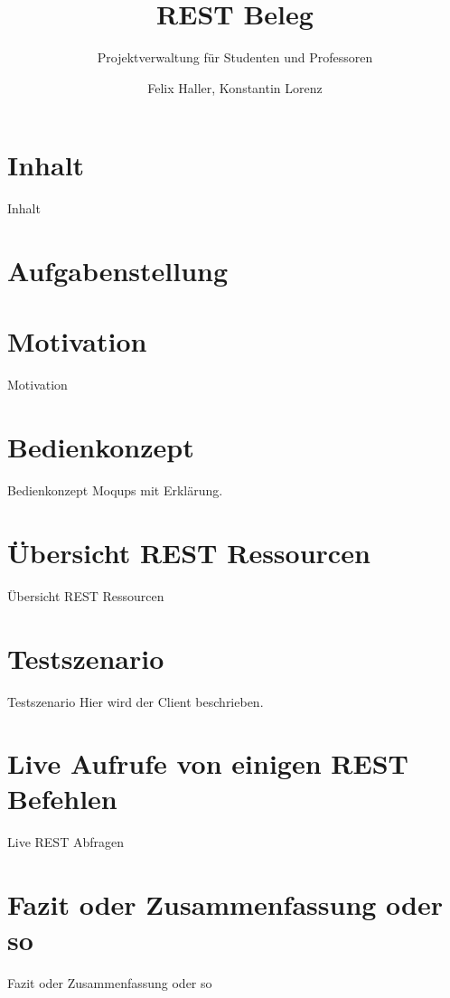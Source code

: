 \documentclass{beamer}
\author{Felix Haller, Konstantin Lorenz}
\title{REST Beleg}
\subtitle{Projektverwaltung für Studenten und Professoren}
\institute{IF13wI-B}
\date{}
\begin{document}
	\maketitle

	\nextframenocontents

	\section*{Inhalt}
	\begin{frame}{Inhalt}
		\tableofcontents
	\end{frame}
	\section{Aufgabenstellung}
	
	\section{Motivation}
		\begin{frame}{Motivation}
		\end{frame}
		
	\section{Bedienkonzept}
		\begin{frame}{Bedienkonzept}
			Moqups mit Erklärung.
			
		\end{frame}
	\section{Übersicht REST Ressourcen}
		\begin{frame}{Übersicht REST Ressourcen}
			
		\end{frame}
	\section{Testszenario}
		\begin{frame}{Testszenario}
			Hier wird der Client beschrieben.
		\end{frame}
		
	\section{Live Aufrufe von einigen REST Befehlen}
		\begin{frame}{Live REST Abfragen}
			
		\end{frame}
		
	\section{Fazit oder Zusammenfassung oder so}
		\begin{frame}{Fazit oder Zusammenfassung oder so}
			
		\end{frame}
	
	
\end{document}
